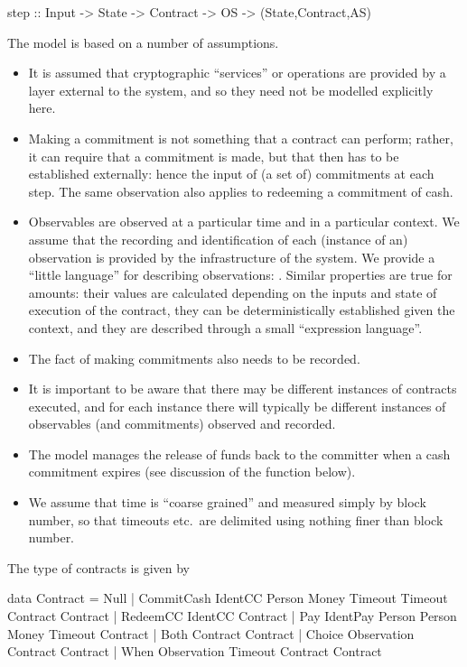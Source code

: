 \documentclass[
      acmsmall
    , screen
    , review=true
  ]{acmart}
\begin{document}
\begin{haskellcode}
step :: Input -> State -> Contract -> OS -> (State,Contract,AS)
\end{haskellcode}

The model is based on a number of assumptions.

\begin{itemize}
\item It is assumed that cryptographic ``services'' or operations are provided by a layer external to the system, and so they need not be modelled explicitly here.
\item Making a commitment is not something that a contract can perform; rather, it can require that a commitment is made, but that then has to be established externally: hence the input of (a set of) commitments at each step. The same observation also applies to redeeming a commitment of cash.
\item Observables are observed at a particular time and in a particular context. We assume that the recording and 
identification of each (instance of an) observation is provided by the infrastructure of the system. We provide a 
``little language'' for describing observations: . Similar properties are true for
 amounts: their values are calculated depending on the inputs and state of execution of the 
contract, they can be deterministically established given the context, and they are described through a small 
``expression language''.
\item The fact of making commitments also needs to be recorded.
\item It is important to be aware that there may be different instances of contracts executed, and for each instance there will typically be different instances of observables (and commitments) observed and recorded.
\item The model manages the release of funds back to the committer when a cash commitment expires (see discussion of the  function below).
\item We assume that time is ``coarse grained'' and measured simply by block number, so that timeouts etc.\ are delimited using nothing finer than block number. 
\end{itemize}

\medskip
\noindent
The type of contracts is given by

\begin{haskellcode}
data Contract =
   Null |
   CommitCash IdentCC Person Money Timeout Timeout Contract Contract |  
   RedeemCC IdentCC Contract |
   Pay IdentPay Person Person Money Timeout Contract |  
   Both Contract Contract |
   Choice Observation Contract Contract |
   When Observation Timeout Contract Contract   
   \end{haskellcode}
\end{document}
